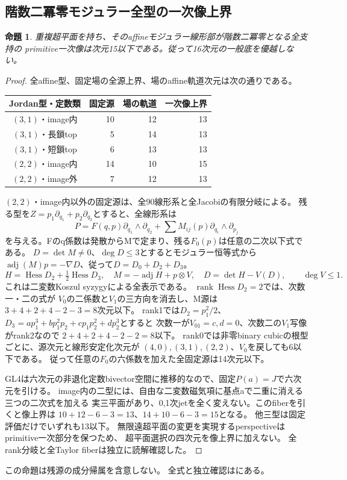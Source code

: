 \documentclass[a4paper,11pt]{ltjsarticle}
\newtheorem{proposition}{命題}[section]
\theoremstyle{definition}
\begin{document}
\subsection{階数二冪零モジュラー全型の一次像上界}
\begin{proposition}\label{prop:nilrank2-beta}
重複超平面を持ち、そのaffineモジュラー線形部が階数二冪零となる全支持の
primitive一次像は次元15以下である。従って16次元の一般底を優越しない。
\end{proposition}
\begin{proof}
全affine型、固定場の全源上界、場のaffine軌道次元は次の通りである。
\begin{center}\small
\begin{tabular}{c|r|r|r}
Jordan型・定数類&固定源&場の軌道&一次像上界\\\hline
$(3,1)$・image内&10&12&13\\
$(3,1)$・長鎖top&5&14&13\\
$(3,1)$・短鎖top&6&13&13\\
$(2,2)$・image内&14&10&15\\
$(2,2)$・image外&7&12&13
\end{tabular}
\end{center}
$(2,2)$・image内以外の固定源は、全90線形系と全Jacobiの有限分岐による。
残る型を$Z=p_1\partial_{q_1}+p_2\partial_{q_2}$とすると、全線形系は
\[
 P=F(q,p)\partial_{q_1}\wedge\partial_{q_2}
   +\sum M_{ij}(p)\partial_{q_i}\wedge\partial_{p_j}
\]
を与える。Fのq係数は発散からMで定まり、残る$F_0(p)$は任意の二次以下式である。
$D=\det M\ne0$、$\deg D\le3$とするとモジュラー恒等式から
$\operatorname{adj}(M)p=-\nabla D$、従って$D=D_0+D_2+D_3$。
\[
 H=\operatorname{Hess}D_2+\tfrac12\operatorname{Hess}D_3,\quad
 M=-\operatorname{adj}H+p\otimes V,\quad
 D=\det H-V(D),\qquad\deg V\le1.
\]
これは二変数Koszul syzygyによる全表示である。
$\operatorname{rank}\operatorname{Hess}D_2=2$では、次数一・二の式が
$V_0$の二係数と$V_1$の三方向を消去し、M源は$3+4+2+4-2-3=8$次元以下。
rank1では$D_2=p_1^2/2$、$D_3=ap_1^3+bp_1^2p_2+cp_1p_2^2+dp_2^3$とすると
次数一が$V_{01}=c,d=0$、次数二の$V_1$写像がrank2なので
$2+4+2+4-2-2=8$以下。
rank0では非零binary cubicの根型ごとに、源次元と線形安定化次元が
$(4,0),(3,1),(2,2)$、$V_0$を戻しても6以下である。
従って任意の$F_0$の六係数を加えた全固定源は14次元以下。

GL4は六次元の非退化定数bivector空間に推移的なので、固定$P(a)=J$で六次元を引ける。
image内の二型には、自由な二変数磁気項に基点aで二重に消える三つの二次式を加える
実三平面があり、0,1次jetを全く変えない。このfiberを引くと像上界は
$10+12-6-3=13$、$14+10-6-3=15$となる。
他三型は固定評価だけでいずれも13以下。
無限遠超平面の変更を実現するperspectiveはprimitive一次部分を保つため、
超平面選択の四次元を像上界に加えない。
全rank分岐と全Taylor fiberは独立に読解確認した。
\end{proof}
この命題は残源の成分帰属を含意しない。
全式と独立確認はにある。
\end{document}
